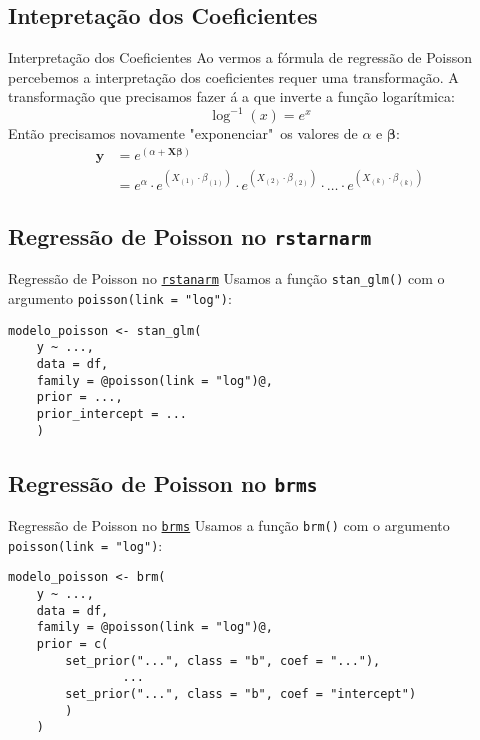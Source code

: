 \subsection{Intepretação dos Coeficientes}
\begin{frame}{Interpretação dos Coeficientes}
    Ao vermos a fórmula de regressão de Poisson percebemos a interpretação dos
    coeficientes requer uma transformação. A transformação que precisamos fazer á a
    que inverte a função logarítmica:
    $$
    \log^{-1}(x) = e^x
    $$
    Então precisamos novamente "exponenciar"~os valores de $\alpha$ e
    $\boldsymbol{\beta}$:
    $$
    \begin{aligned}
        \boldsymbol{y} &= e^{(\alpha +  \mathbf{X} \boldsymbol{\beta})} \\
        &= e^{\alpha} \cdot e^{ \left( X_{(1)} \cdot \beta_{(1)} \right) } \cdot e^{ \left( X_{(2)} \cdot \beta_{(2)} \right) } \cdot \dots \cdot e^{ \left( X_{(k)} \cdot \beta_{(k)} \right) }
    \end{aligned}
    $$
\end{frame}

\subsection{Regressão de Poisson no \texttt{rstarnarm}}
\begin{frame}[fragile]{Regressão de Poisson no \href{http://mc-stan.org/rstanarm/}{\texttt{rstanarm}}}
    Usamos a função \texttt{stan\_glm()} com o argumento \texttt{poisson(link = "log")}:
    \vfill
    \begin{lstlisting}[basicstyle=\small]
    modelo_poisson <- stan_glm(
    y ~ ...,
    data = df,
    family = @poisson(link = "log")@,
    prior = ...,
    prior_intercept = ...
    )
    \end{lstlisting}
\end{frame}

\subsection{Regressão de Poisson no \texttt{brms}}
\begin{frame}[fragile]{Regressão de Poisson no \href{https://paul-buerkner.github.io/brms/}{\texttt{brms}}}
    Usamos a função \texttt{brm()} com o argumento \texttt{poisson(link = "log")}:
    \vfill
    \begin{lstlisting}[basicstyle=\small]
    modelo_poisson <- brm(
    y ~ ...,
    data = df,
    family = @poisson(link = "log")@,
    prior = c(
        set_prior("...", class = "b", coef = "..."),
                ...
        set_prior("...", class = "b", coef = "intercept")
        )
    )
    \end{lstlisting}
\end{frame}
